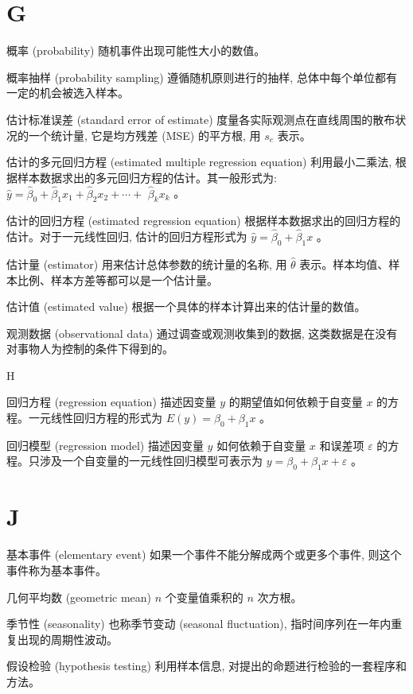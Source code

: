 \documentclass[10pt]{article}
\begin{document}
\begin{CJK*}{UTF8}{bsmi}
\section*{G}
概率 (probability) 随机事件出现可能性大小的数值。

概率抽样 (probability sampling) 遵循随机原则进行的抽样, 总体中每个单位都有一定的机会被选入样本。

估计标准误差 (standard error of estimate) 度量各实际观测点在直线周围的散布状况的一个统计量, 它是均方残差 (MSE) 的平方根, 用 $s_{e}$ 表示。

估计的多元回归方程 (estimated multiple regression equation) 利用最小二乘法, 根据样本数据求出的多元回归方程的估计。其一般形式为: $\hat{y}=\hat{\beta}_{0}+\hat{\beta}_{1} x_{1}+\hat{\beta}_{2} x_{2}+\cdots+$ $\hat{\beta}_{k} x_{k}$ 。

估计的回归方程 (estimated regression equation) 根据样本数据求出的回归方程的估计。对于一元线性回归, 估计的回归方程形式为 $\hat{y}=\hat{\beta}_{0}+\hat{\beta}_{1} x$ 。

估计量 (estimator) 用来估计总体参数的统计量的名称, 用 $\hat{\theta}$ 表示。样本均值、样本比例、样本方差等都可以是一个估计量。

估计值 (estimated value) 根据一个具体的样本计算出来的估计量的数值。

观测数据 (observational data) 通过调查或观测收集到的数据, 这类数据是在没有对事物人为控制的条件下得到的。

H

回归方程 (regression equation) 描述因变量 $y$ 的期望值如何依赖于自变量 $x$ 的方程。一元线性回归方程的形式为 $E(y)=\beta_{0}+\beta_{1} x$ 。

回归模型 (regression model) 描述因变量 $y$ 如何依赖于自变量 $x$ 和误差项 $\varepsilon$ 的方程。只涉及一个自变量的一元线性回归模型可表示为 $y=\beta_{0}+\beta_{1} x+\varepsilon$ 。

\section*{J}
基本事件 (elementary event) 如果一个事件不能分解成两个或更多个事件, 则这个事件称为基本事件。

几何平均数 (geometric mean) $n$ 个变量值乘积的 $n$ 次方根。

季节性 (seasonality) 也称季节变动 (seasonal fluctuation), 指时间序列在一年内重复出现的周期性波动。

假设检验 (hypothesis testing) 利用样本信息, 对提出的命题进行检验的一套程序和方法。


\end{CJK*}
\end{document}
